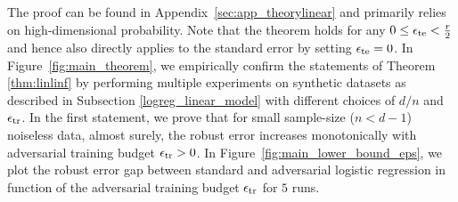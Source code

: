 The proof can be found in Appendix~\ref{sec:app_theorylinear} and
primarily relies on high-dimensional probability. Note that the
theorem holds for any $0\leq \epsilon_{\text{te}} <\frac{r}{2}$ and hence
also directly applies to the standard error by setting $\epsilon_{\text{te}} =
0$. In Figure~\ref{fig:main_theorem}, we empirically confirm the statements of Theorem \ref{thm:linlinf} by performing multiple experiments on synthetic datasets as described in Subsection \ref{logreg_linear_model} with different choices of $d/n$ and $\epsilon_{\text{tr}}$. 
In the first statement, we prove that for small
sample-size ($n<d-1$) noiseless data,
almost surely, the robust error increases monotonically with
adversarial training budget $\epsilon_{\text{tr}} >0$. %
In Figure~\ref{fig:main_lower_bound_eps}, we plot the robust error gap between standard and adversarial logistic regression in function of the adversarial training budget $\epsilon_{\text{tr}}$ for $5$ runs. 


